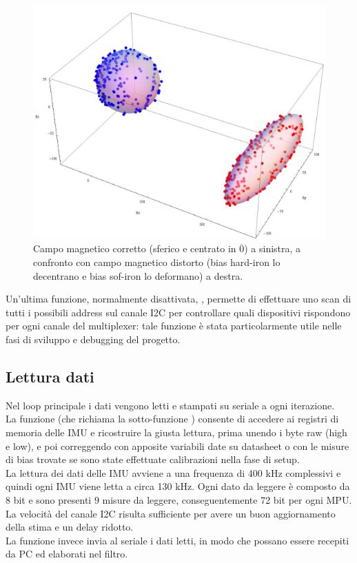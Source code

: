\begin{figure}[H]
    \includegraphics[scale=0.65]{immagini/distorsione campo magnetico confronto.PNG}
    \centering
    \caption{Campo magnetico corretto (sferico e centrato in $\overline{0}$) a sinistra, a confronto con campo magnetico distorto (bias hard-iron lo decentrano e bias sof-iron lo deformano) a destra.}
\end{figure}

Un'ultima funzione, normalmente disattivata, , permette di effettuare uno scan di tutti i possibili address sul canale I2C per controllare quali dispositivi rispondono per ogni canale del multiplexer: tale funzione è stata particolarmente utile nelle fasi di sviluppo e debugging del progetto.\\

\subsection{Lettura dati}

Nel loop principale i dati vengono letti e stampati su seriale a ogni iterazione.\\

La funzione  (che richiama la sotto-funzione ) consente di accedere ai registri di memoria delle IMU e ricostruire la giusta lettura, prima unendo i byte raw (high e low), e poi correggendo con apposite variabili date su datasheet o con le misure di bias trovate se sono state effettuate calibrazioni nella fase di setup.\\

La lettura dei dati delle IMU avviene a una frequenza di 400 kHz complessivi e quindi ogni IMU viene letta a circa 130 kHz. Ogni dato da leggere è composto da 8 bit e sono presenti 9 misure da leggere, conseguentemente 72 bit per ogni MPU.\\
La velocità del canale I2C risulta sufficiente per avere un buon aggiornamento della stima e un delay ridotto.\\


La funzione  invece invia al seriale i dati letti, in modo che possano essere recepiti da PC ed elaborati nel filtro.


\clearpage